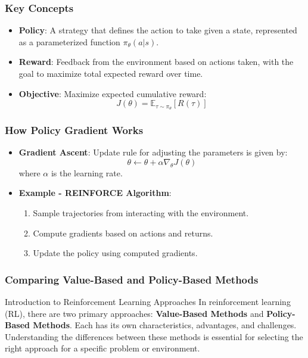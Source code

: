 \documentclass[aspectratio=169]{beamer}
\begin{document}
\begin{frame}[fragile]
    \frametitle{Key Concepts}
    \begin{itemize}
        \item \textbf{Policy}: A strategy that defines the action to take given a state, represented as 
        a parameterized function \( \pi_{\theta}(a|s) \).
        
        \item \textbf{Reward}: Feedback from the environment based on actions taken, with the 
        goal to maximize total expected reward over time.
        
        \item \textbf{Objective}: Maximize expected cumulative reward:
        \begin{equation}
            J(\theta) = \mathbb{E}_{\tau \sim \pi_{\theta}} \left[ R(\tau) \right]
        \end{equation}
    \end{itemize}
\end{frame}

\begin{frame}[fragile]
    \frametitle{How Policy Gradient Works}
    \begin{itemize}
        \item \textbf{Gradient Ascent}: Update rule for adjusting the parameters is given by:
        \begin{equation}
            \theta \leftarrow \theta + \alpha \nabla_{\theta} J(\theta)
        \end{equation}
        where \( \alpha \) is the learning rate.
        
        \item \textbf{Example - REINFORCE Algorithm}:
        \begin{enumerate}
            \item Sample trajectories from interacting with the environment.
            \item Compute gradients based on actions and returns.
            \item Update the policy using computed gradients.
        \end{enumerate}
    \end{itemize}
\end{frame}

\begin{frame}[fragile]
    \frametitle{Comparing Value-Based and Policy-Based Methods}
    \begin{block}{Introduction to Reinforcement Learning Approaches}
        In reinforcement learning (RL), there are two primary approaches: 
        \textbf{Value-Based Methods} and \textbf{Policy-Based Methods}. Each has its own characteristics, advantages, and challenges.
        Understanding the differences between these methods is essential for selecting the right approach for a specific problem or environment.
    \end{block}
\end{frame}
\end{document}
